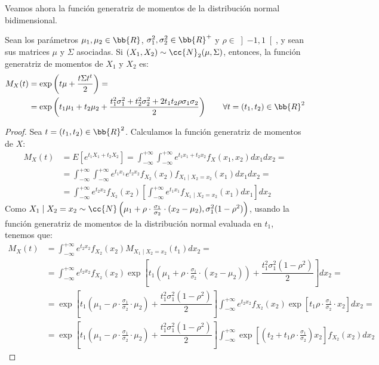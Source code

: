 Veamos ahora la función generatriz de momentos de la distribución normal bidimensional.
\begin{prop}
    Sean los parámetros $\mu_1, \mu_2\in \bb{R}$, $\sigma_1^2, \sigma_2^2\in \bb{R}^+$ y $\rho\in \left]-1,1\right[$, y sean sus matrices $\mu$ y $\Sigma$ asociadas.
    Si $(X_1, X_2)\sim \cc{N}_2(\mu, \Sigma)$, entonces, la función generatriz de momentos de $X_1$ y $X_2$ es:    
    \begin{align*}
        M_X(t) &= \exp\left(t \mu +\dfrac{t\Sigma t^t}{2}\right)
        =\\&= \exp\left(t_1\mu_1+t_2\mu_2+\dfrac{t_1^2\sigma_1^2+t_2^2\sigma_2^2+2t_1t_2\rho\sigma_1\sigma_2}{2}\right)\qquad \forall t=(t_1, t_2)\in \bb{R}^2
    \end{align*}
\end{prop}
\begin{proof}
    Sea $t=(t_1, t_2)\in \bb{R}^2$. Calculamos la función generatriz de momentos de $X$:
    \begin{align*}
        M_X(t)&=E\left[e^{t_1X_1+t_2X_2}\right]
        = \int_{-\infty}^{+\infty}\int_{-\infty}^{+\infty} e^{t_1x_1+t_2x_2}f_X(x_1,x_2)dx_1dx_2
        =\\&= \int_{-\infty}^{+\infty}\int_{-\infty}^{+\infty} e^{t_1x_1}e^{t_2x_2}f_{X_2}(x_2)f_{X_1\mid X_2=x_2}(x_1)dx_1dx_2
        =\\&= \int_{-\infty}^{+\infty} e^{t_2x_2}f_{X_2}(x_2)\left[\int_{-\infty}^{+\infty} e^{t_1x_1}f_{X_1\mid X_2=x_2}(x_1)dx_1\right]dx_2
    \end{align*}
    Como $X_1\mid X_2=x_2\sim \cc{N}\left(\mu_1+\rho\cdot \frac{\sigma_1}{\sigma_2}\cdot (x_2-\mu_2), \sigma_1^2(1-\rho^2)\right)$, usando la función generatriz de momentos de la distribución normal evaluada en $t_1$, tenemos que:
    \begin{align*}
        M_X(t)&= \int_{-\infty}^{+\infty} e^{t_2x_2}f_{X_2}(x_2)M_{X_1\mid X_2=x_2}(t_1)dx_2
        =\\&= \int_{-\infty}^{+\infty} e^{t_2x_2}f_{X_2}(x_2)\exp\left[t_1\left(\mu_1+\rho\cdot \frac{\sigma_1}{\sigma_2}\cdot (x_2-\mu_2)\right)+\dfrac{t_1^2\sigma_1^2(1-\rho^2)}{2}\right]dx_2
        =\\&= \exp\left[t_1\left(\mu_1-\rho\cdot \frac{\sigma_1}{\sigma_2}\cdot \mu_2\right)+\dfrac{t_1^2\sigma_1^2(1-\rho^2)}{2}\right]\int_{-\infty}^{+\infty} e^{t_2x_2}f_{X_2}(x_2)\exp\left[t_1\rho\cdot \frac{\sigma_1}{\sigma_2}\cdot x_2\right]dx_2
        =\\&= \exp\left[t_1\left(\mu_1-\rho\cdot \frac{\sigma_1}{\sigma_2}\cdot \mu_2\right)+\dfrac{t_1^2\sigma_1^2(1-\rho^2)}{2}\right]\int_{-\infty}^{+\infty} \exp\left[\left(t_2+t_1\rho\cdot \frac{\sigma_1}{\sigma_2}\right)x_2\right]f_{X_2}(x_2)dx_2
    \end{align*}


\end{proof}
